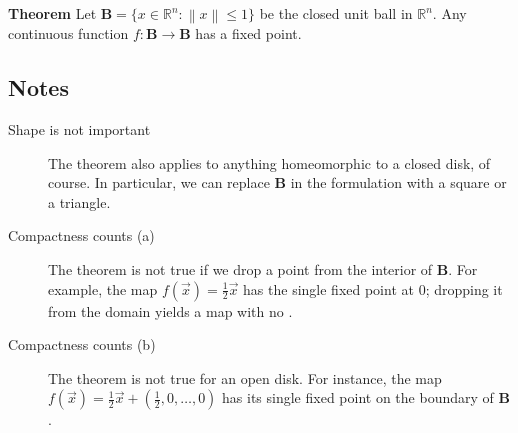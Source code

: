 \documentclass[12pt]{article}
\newcommand{\norm}[1]{\left\|#1\right\|}
\newcommand{\Reals}{\mathbb{R}}
\begin{document}
{\bf Theorem}
Let $\textbf{B}=\{x\in\Reals^n: \norm{x}\le 1\}$ be the closed unit ball in 
$\Reals^n$.  Any continuous function $f: \textbf{B}\to\textbf{B}$ has a fixed point.

\subsection*{Notes}

\begin{description}

\item[Shape is not important]
The theorem also applies to anything homeomorphic to a closed disk, of course.  In particular, we can replace $\textbf{B}$ in the formulation with a square or 
a triangle.

\item[Compactness counts (a)]
The theorem is not true if we drop a point from the interior of $\textbf{B}$.  For example, the map $f(\vec{x})=\frac{1}{2}\vec{x}$ has the single fixed point at $0$; dropping it from the domain yields a map with no .

\item[Compactness counts (b)]
The theorem is not true for an open disk.  For instance, the map $f(\vec{x})=\frac{1}{2}\vec{x}+(\frac{1}{2},0,\ldots,0)$ has its single fixed point on the boundary of $\textbf{B}$.

\end{description}
\end{document}
